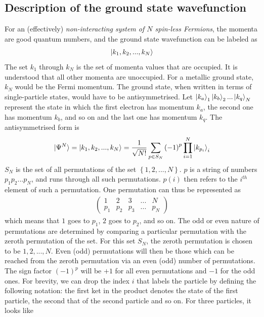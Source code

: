 \documentclass[12pt,twoside]{article}
\numberwithin{equation}{section}
\begin{document}
{\subsection{Description of the ground state wavefunction}
For an (effectively) \textit{non-interacting system of \(N\) spin-less Fermions}, the momenta are good quantum numbers, and the ground state wavefunction can be labeled as
\begin{equation}\begin{aligned}
	\ket{k_1, k_2, ..., k_N}
\end{aligned}\end{equation}
The set \(k_1\) through \(k_N\) is the set of momenta values that are occupied. It is understood that all other momenta are unoccupied. For a metallic ground state, \(k_N\) would be the Fermi momentum. The ground state, when written in terms of single-particle states, would have to be antisymmetrised. Let \(\ket{k_a}_1\ket{k_b}_2...\ket{k_q}_N\) represent the state in which the first electron has momentum \(k_a\), the second one has momentum \(k_b\), and so on and the last one has momentum \(k_q\). The antisymmetrised form is
\begin{equation}\begin{aligned}
	\label{slater}
	\ket{\Psi^N} = \ket{k_1, k_2, ..., k_N} = \frac{1}{\sqrt{N!}}\sum_{p \in S_N} \left( -1 \right) ^p \prod_{i=1}^N \ket{k_{p_i}}_i
\end{aligned}\end{equation}
\(S_N\) is the set of all permutations of the set \(\left\{1,2, ..., N \right\} \). \(p\) is a string of numbers \(p_1 p_2 ... p_N\), and runs through all such permutations. \(p(i)\) then refers to the \(i^{th}\) element of such a permutation. One permutation can thus be represented as
\begin{equation}\begin{aligned}
	\begin{pmatrix} 1 & 2 & 3 & ... & N \\
			p_1 & p_2 & p_3 & ... & p_N
	\end{pmatrix} 
\end{aligned}\end{equation}
which means that \(1\) goes to \(p_1\), \(2\) goes to \(p_2\), and so on. The odd or even nature of permutations are determined by comparing a particular permutation with the zeroth permutation of the set. For this set \(S_N\), the zeroth permutation is chosen to be \(1,2,...,N\). Even (odd) permutations will then be those which can be reached from the zeroth permutation via an even (odd) number of permutations. The sign factor \(\left( -1 \right) ^p\) will be \(+1\) for all even permutations and \(-1\) for the odd ones. For brevity, we can drop the index \(i\) that labels the particle by defining the following notation: the first ket in the product denotes the state of the first particle, the second that of the second particle and so on. For three particles, it looks like
}
\end{document}
